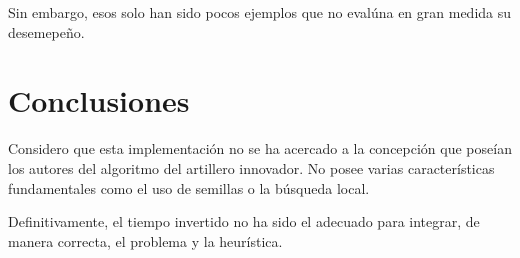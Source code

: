 \documentclass[a4paper]{report}
\begin{document}
  Sin embargo, esos solo han sido pocos ejemplos que no eval\'una en gran medida su desemepe\~no.

  \chapter{Conclusiones}
  Considero que esta implementaci\'on no se ha acercado a la concepci\'on que pose\'ian los autores
  del algoritmo del artillero innovador. No posee varias caracter\'isticas fundamentales como el
  uso de semillas o la b\'usqueda local.

  Definitivamente, el tiempo invertido no ha sido el adecuado para integrar, de manera correcta,
  el problema y la heur\'istica.




  {}
  
\end{document}
